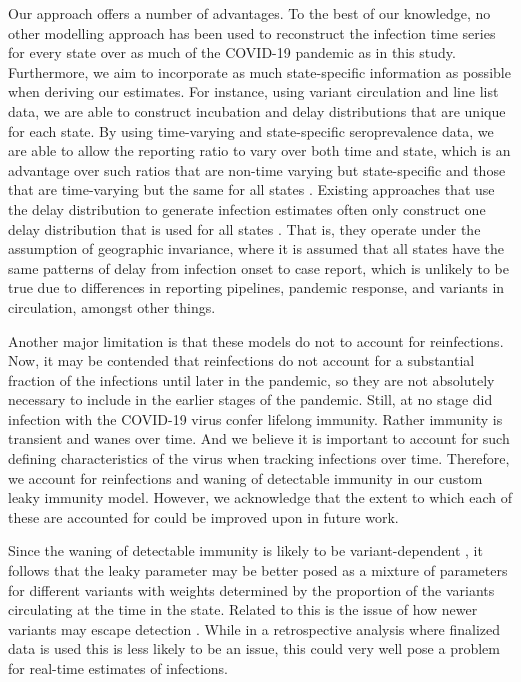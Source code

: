 \documentclass{article}
\begin{document}
Our approach offers a number of advantages.
To the best of our knowledge, no other modelling approach has been used to 
reconstruct the infection time series
for every state over as much of the COVID-19 pandemic as in this study.
Furthermore, we aim to incorporate as much state-specific information as
possible when deriving our estimates. For instance, using variant circulation
and line list data, we are able to construct incubation and delay distributions
that are unique for each state. By using time-varying and state-specific
seroprevalence data, we are able to allow the reporting ratio to vary over both
time and state, which is an advantage over such ratios that are non-time varying
but state-specific and those that are time-varying but the same for all states
\citep{unwin2020state, uga2020covid19}. 
Existing approaches that use the delay distribution to generate infection
estimates often only construct one delay distribution that is used for all
states \citep{chitwood2021reconstructing, jahja2022real}. That is, they operate
under the assumption of geographic invariance, where it is assumed that all
states have the same patterns of delay from infection onset to case report,
which is unlikely to be true due to differences in reporting pipelines, pandemic
response, and variants in circulation, amongst other things. 

Another major limitation is that these models do not to account for
reinfections. Now, it may be contended that reinfections do not account for a
substantial fraction of the infections until later in the pandemic, so they are
not absolutely necessary to include in the earlier stages of the pandemic.
Still, at no stage did infection with the COVID-19 virus confer lifelong
immunity. Rather immunity is transient and wanes over time. And we believe it is
important to account for such defining characteristics of the virus when
tracking infections over time. Therefore, we account for reinfections and waning
of detectable immunity in our custom leaky immunity model. However, we 
acknowledge that the extent to which each of these are accounted for could be
improved upon in future work. 

Since the waning of detectable immunity is likely to be variant-dependent
\citep{pooley2023durability}, it follows that the leaky parameter may be better
posed as a mixture of parameters for different variants with weights determined
by the proportion of the variants circulating at the time in the state. Related
to this is the issue of how newer variants may escape detection
\citep{nih2022assessing, fda2023sars}. While in a retrospective analysis where
finalized data is used this is less likely to be an issue, this could very well
pose a problem for real-time estimates of infections.
\end{document}
